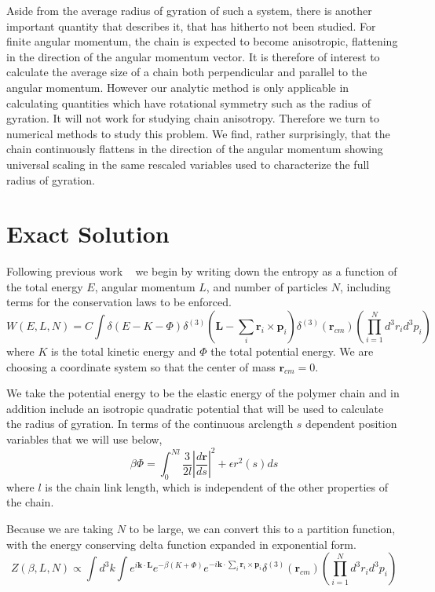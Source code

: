 \documentclass[11pt]{ucthesis}
\begin{document}
Aside from the average radius of gyration of such a system, there is
another important quantity that describes it, that has hitherto not
been studied. For finite angular momentum, the chain is expected to
become anisotropic, flattening in the direction of the angular momentum
vector. It is therefore of interest to calculate the average size
of a chain both perpendicular and parallel to the angular momentum.
However our analytic method is only applicable in calculating quantities
which have rotational symmetry such as the radius of gyration. It will
not work for studying chain anisotropy. Therefore we turn to numerical
methods to study this problem. We find, rather surprisingly, that the
chain continuously flattens in the direction of the angular momentum
showing universal scaling in the same rescaled variables used to
characterize the full radius of gyration. 



\chapter{Exact Solution}
Following previous work ~\cite{laliena} we begin by writing down the entropy as a function of the total energy $E$, angular momentum $L$, and number of particles $N$,  including terms for the conservation laws to be enforced. 
\begin{equation}
W(E,L,N) = C \int \delta(E - K - \Phi)\delta^{(3)}(\mathbf{L} - \sum_i \mathbf{r}_i \times \mathbf{p}_i)\delta^{(3)}(\mathbf{r}_{cm})(\prod_{i=1}^N d^3r_id^3p_i)
\end{equation}
where $K$ is the total kinetic energy and $\Phi$ the total potential energy. We are choosing a coordinate system so that
the center of mass $\mathbf{r}_{cm} = 0$.

We take the potential energy to be the elastic energy of the polymer chain and in addition include an isotropic quadratic potential that
will be used to calculate the radius of gyration. In terms of the continuous arclength $s$ dependent position variables that we will use 
below, 
\begin{equation}\label{eq:DefPhi}
\beta \Phi =  \int^{Nl}_0 \frac{3}{2l} |\frac{d \mathbf{r}}{ds}|^2 + \epsilon r^2(s)  ds 
\end{equation}
where $l$ is the chain link length, which is independent of the other properties of the chain.

Because we are taking $N$ to be large, we can convert this to a partition function, with the energy conserving delta function expanded in exponential form.
\begin{equation}
Z(\beta,L,N) \propto  \int d^3k \int e^{ i\mathbf{k\cdot L} }e^{ -\beta(K+\Phi) }e^{ -i\mathbf{k}\cdot \sum_i \mathbf{r}_i\times \mathbf{p}_i }\delta^{(3)}(\mathbf{r}_{cm})(\prod_{i=1}^N d^3r_id^3p_i)
\end{equation}
\end{document}
